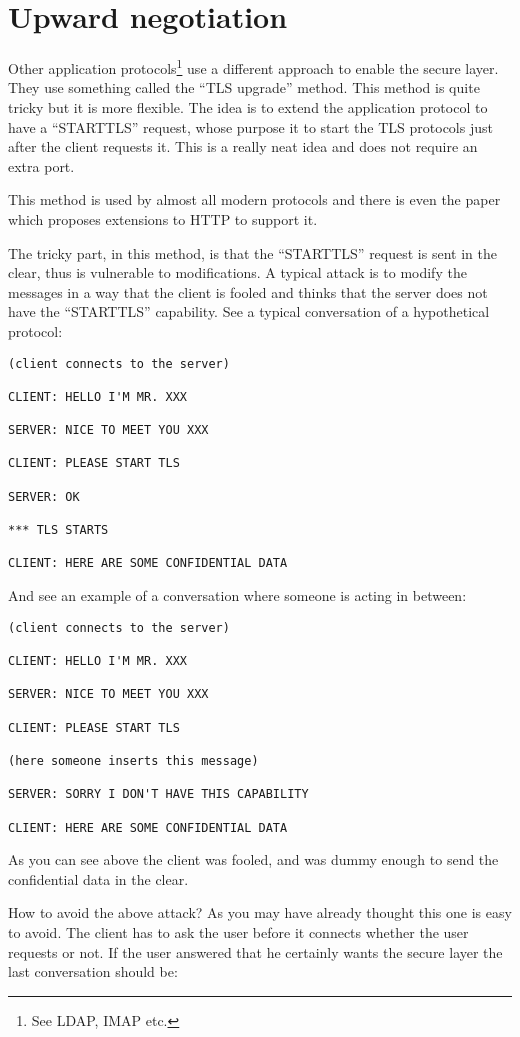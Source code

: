 \section{Upward negotiation}
Other application protocols\footnote{See LDAP, IMAP etc.}
use a different approach to enable the secure layer.
They use something called the ``TLS upgrade'' method. This method
is quite tricky but it is more flexible. The idea is to extend
the application protocol to have a ``STARTTLS'' request, whose purpose
it to start the TLS protocols just after the client requests it.
This is a really neat idea and does not require an extra port.
\par
This method is used by almost all modern protocols and there is
even the \cite{RFC2817} paper which proposes extensions to HTTP
to support it.
\par
The tricky part, in this method, is that the ``STARTTLS'' request is sent 
in the clear, thus is vulnerable to modifications. 
A typical attack is to modify the
messages in a way that the client is fooled and thinks that the server
does not have the ``STARTTLS'' capability. See a typical conversation
of a hypothetical protocol:
\begin{verbatim}
(client connects to the server)

CLIENT: HELLO I'M MR. XXX

SERVER: NICE TO MEET YOU XXX

CLIENT: PLEASE START TLS

SERVER: OK

*** TLS STARTS

CLIENT: HERE ARE SOME CONFIDENTIAL DATA

\end{verbatim}

And see an example of a conversation where someone is acting
in between:

\begin{verbatim}
(client connects to the server)

CLIENT: HELLO I'M MR. XXX

SERVER: NICE TO MEET YOU XXX

CLIENT: PLEASE START TLS

(here someone inserts this message)

SERVER: SORRY I DON'T HAVE THIS CAPABILITY

CLIENT: HERE ARE SOME CONFIDENTIAL DATA

\end{verbatim}

As you can see above the client was fooled, and was dummy enough
to send the confidential data in the clear.
\par
How to avoid the above attack? As you may have already thought
this one is easy to avoid. The client has to ask the user before it connects
whether the user requests \tls{} or not. If the user answered that he
certainly wants the secure layer the last conversation should be:

